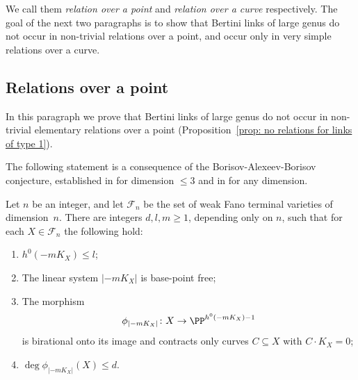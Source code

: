 We call them \emph{relation over a point} and \emph{relation over a curve} respectively. The goal of the next two paragraphs is to show that Bertini links of large genus do not occur in non-trivial relations over a point, and occur only in very simple relations over a curve.

\subsection{Relations over a point}

In this paragraph we prove that Bertini links of large genus do not occur in non-trivial elementary relations over a point (Proposition~\ref{prop: no relations for links of type 1}).

The following statement is a consequence of the Borisov-Alexeev-Borisov conjecture, established in \cite{KMMT,Kawamata} for dimension $\leqslant 3$ and in \cite{BirkarS} for any dimension.

\Changel
\begin{prop}\label{prop: BAB}
Let $n$ be an integer, and let $\mathcal{F}_n$ be the set of weak Fano terminal varieties of dimension~$n$. There are integers $d,l,m\ge 1$, depending only on $n$, such that for each $X \in \mathcal{F}_n$ the following hold:
\begin{enumerate}
\item
$h^0(-mK_X)\le l$;
\item
The linear system $\lvert -mK_X \rvert$ is base-point free;
\item
The morphism
\[
\phi_{|-mK_X|}\colon X\to \PP^{h^0(-mK_X)-1}
\]
is birational onto its image and contracts only curves $C\subseteq X$ with $C\cdot K_X=0$;
\item
$\deg \phi_{|-mK_X|}(X) \le d$.
\end{enumerate}
\end{prop}
\Changelback

